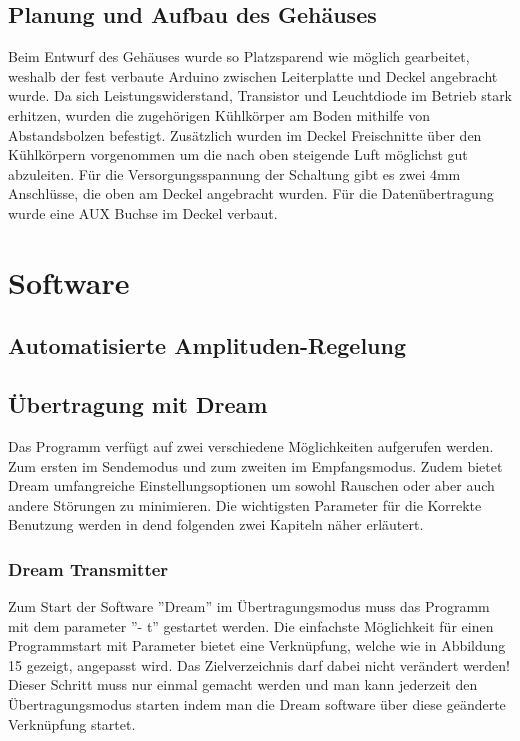 \subsection{Planung und Aufbau des Gehäuses}
\label{subsec:Unterabschnitt12}

Beim Entwurf des Gehäuses wurde so Platzsparend wie möglich gearbeitet, weshalb
der fest verbaute Arduino zwischen Leiterplatte und Deckel angebracht wurde.
Da sich Leistungswiderstand, Transistor und Leuchtdiode im Betrieb stark erhitzen,
wurden die zugehörigen Kühlkörper am Boden mithilfe von Abstandsbolzen
befestigt. Zusätzlich wurden im Deckel Freischnitte über den Kühlkörpern vorgenommen
um die nach oben steigende Luft möglichst gut abzuleiten. Für die
Versorgungsspannung der Schaltung gibt es zwei 4mm Anschlüsse, die oben am
Deckel angebracht wurden. Für die Datenübertragung wurde eine AUX Buchse im
Deckel verbaut.

\section{Software}
\label{sec:Software}
\subsection{Automatisierte Amplituden-Regelung}
\label{subsec:Unterabschnitt12}


\subsection{Übertragung mit Dream}
\label{subsec:dream}

Das Programm verfügt auf zwei verschiedene Möglichkeiten aufgerufen werden. Zum ersten im Sendemodus und zum zweiten im Empfangsmodus. Zudem bietet Dream umfangreiche Einstellungsoptionen um sowohl Rauschen oder aber auch andere Störungen zu minimieren. Die wichtigsten Parameter für die Korrekte Benutzung werden in dend
folgenden zwei Kapiteln näher erläutert.



\subsubsection{Dream Transmitter}
\label{subsubsec:dreamtx}
Zum Start der Software ”Dream” im Übertragungsmodus muss das Programm mit dem parameter ”- t” gestartet werden. Die einfachste Möglichkeit für einen Programmstart mit Parameter bietet eine Verknüpfung, welche wie in Abbildung 15 gezeigt, angepasst wird. Das Zielverzeichnis darf dabei nicht verändert werden! Dieser Schritt muss nur einmal gemacht werden und man kann jederzeit den Übertragungsmodus starten indem man die Dream software über diese geänderte Verknüpfung startet.

